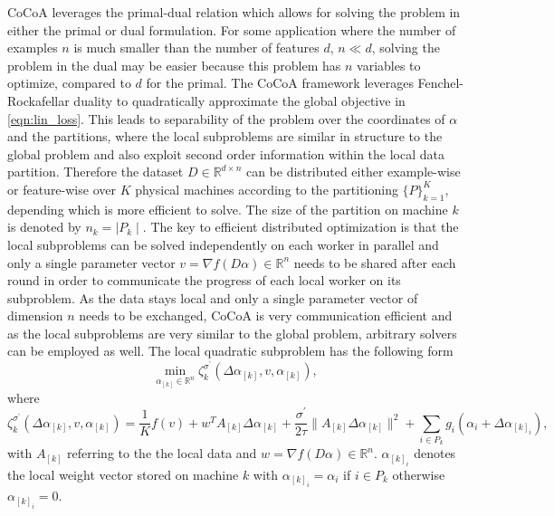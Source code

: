 CoCoA leverages the primal-dual relation which allows for solving the problem in either the primal or dual formulation.
For some application where the number of examples $n$ is much smaller than the number of features $d$, $n \ll d$, solving the problem in the dual may be easier because this problem has $n$ variables to optimize, compared to $d$ for the primal.
The CoCoA framework leverages Fenchel-Rockafellar duality to quadratically approximate the global objective in \ref{eqn:lin_loss}.
This leads to separability of the problem over the coordinates of $\alpha$ and the partitions, where the local subproblems are similar in structure to the global problem and also exploit second order information within the local data partition.
Therefore the dataset $D \in \mathbb{R}^{d \times n}$ can be distributed either example-wise or feature-wise over $K$ physical machines according to the partitioning $\{P\}_{k=1}^K$, depending which is more efficient to solve.
The size of the partition on machine $k$ is denoted by $n_k = \mid P_k \mid$.
The key to efficient distributed optimization is that the local subproblems can be solved independently on each worker in parallel and only a single parameter vector $v = \nabla f(D\alpha) \in \mathbb{R}^n$ needs to be shared after each round in order to communicate the progress of each local worker on its subproblem.
As the data stays local and only a single parameter vector of dimension $n$ needs to be exchanged, CoCoA is very communication efficient and as the local subproblems are very similar to the global problem, arbitrary solvers can be employed as well.
The local quadratic subproblem has the following form
\begin{equation}
\min_{\alpha_{[k]} \in \mathbb{R}^n} \zeta_k^{\sigma^\prime}(\Delta\alpha_{[k]}, v, \alpha_{[k]}),
\label{eqn:min_local_subp}
\end{equation}
where
\begin{equation}
\zeta_k^{\sigma^\prime}(\Delta\alpha_{[k]}, v, \alpha_{[k]}) = \frac{1}{K}f(v) + w^TA_{[k]}\Delta\alpha_{[k]} + \frac{\sigma^\prime}{2\tau}\|A_{[k]}\Delta\alpha_{[k]}\|^2 + \sum_{i \in P_k}g_i(\alpha_i + \Delta\alpha_{[k]_i}),
\label{eqn:local_subp}
\end{equation}
with $A_{[k]}$ referring to the the local data and $w = \nabla f(D\alpha) \in \mathbb{R}^n$.
$\alpha_{[k]_i}$ denotes the local weight vector stored on machine $k$ with $\alpha_{[k]_i} = \alpha_i$ if $i \in P_k$ otherwise $\alpha_{[k]_i} = 0$.
